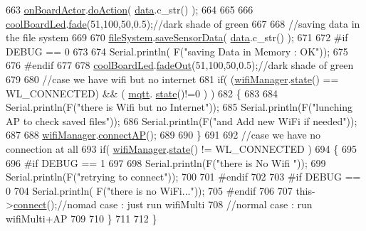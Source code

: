 \begin{DoxyCode}
663     \hyperlink{class_cool_board_a4ac693895c21025b8808653f2a4316e6}{onBoardActor}.\hyperlink{class_cool_board_actor_a96a45658d32c6b95caa2f385c7da32cd}{doAction}( \hyperlink{class_cool_board_a427fb753dd8575bdf821c70a5c63d695}{data}.c\_str() );  
664 
665 
666     \hyperlink{class_cool_board_a1b1d3c684a5baa56b08486e192fd8e97}{coolBoardLed}.\hyperlink{class_cool_board_led_af1cacbaa88db8bcf6042c1083ba41155}{fade}(51,100,50,0.5);\textcolor{comment}{//dark shade of green  }
667     
668     \textcolor{comment}{//saving data in the file system}
669     
670     \hyperlink{class_cool_board_a42c2586fbb13ff7f06538e9284e8538d}{fileSystem}.\hyperlink{class_cool_file_system_afa3a4feae94871d4d3b6bebb701c2e67}{saveSensorData}( \hyperlink{class_cool_board_a427fb753dd8575bdf821c70a5c63d695}{data}.c\_str() );
671 
672 \textcolor{preprocessor}{    #if DEBUG == 0}
673 
674         Serial.println( F(\textcolor{stringliteral}{"saving Data in Memory : OK"}));
675 
676 \textcolor{preprocessor}{    #endif}
677 
678     \hyperlink{class_cool_board_a1b1d3c684a5baa56b08486e192fd8e97}{coolBoardLed}.\hyperlink{class_cool_board_led_a93d545679237e8cc858324367149775c}{fadeOut}(51,100,50,0.5);\textcolor{comment}{//dark shade of green}
679 
680     \textcolor{comment}{//case we have wifi but no internet}
681     \textcolor{keywordflow}{if}( (\hyperlink{class_cool_board_acd88e6003606b47479ebba81e4aceeca}{wifiManager}.\hyperlink{class_cool_wifi_a1c7b4d82a4098d346e7593dce92039fa}{state}() == WL\_CONNECTED) && ( \hyperlink{class_cool_board_a2399f44d7c23c1149a335cb3b46d90f1}{mqtt}.
      \hyperlink{class_cool_m_q_t_t_a5d003307eff78efbd585e42b43b72b6d}{state}()!=0 ) )
682     \{
683         
684         Serial.println(F(\textcolor{stringliteral}{"there is Wifi but no Internet"}));
685         Serial.println(F(\textcolor{stringliteral}{"lunching AP to check saved files"}));
686         Serial.println(F(\textcolor{stringliteral}{"and Add new WiFi if needed"}));
687         
688         \hyperlink{class_cool_board_acd88e6003606b47479ebba81e4aceeca}{wifiManager}.\hyperlink{class_cool_wifi_a7c857f27161782f5ef1d62d552aff971}{connectAP}();
689         
690     \}
691     
692     \textcolor{comment}{//case we have no connection at all}
693     \textcolor{keywordflow}{if}( \hyperlink{class_cool_board_acd88e6003606b47479ebba81e4aceeca}{wifiManager}.\hyperlink{class_cool_wifi_a1c7b4d82a4098d346e7593dce92039fa}{state}() != WL\_CONNECTED )
694     \{
695     
696 \textcolor{preprocessor}{    #if DEBUG == 1}
697         
698         Serial.println(F(\textcolor{stringliteral}{"there is No Wifi "}));
699         Serial.println(F(\textcolor{stringliteral}{"retrying to connect"}));
700     
701 \textcolor{preprocessor}{    #endif}
702 
703 \textcolor{preprocessor}{    #if DEBUG == 0}
704         Serial.println( F(\textcolor{stringliteral}{"there is no WiFi..."}));
705 \textcolor{preprocessor}{    #endif}
706         
707         this->\hyperlink{class_cool_board_a519de78b807f8ec6463ff484eb925918}{connect}();\textcolor{comment}{//nomad case : just run wifiMulti}
708                 \textcolor{comment}{//normal case : run wifiMulti+AP}
709         
710     \}   
711 
712 \}
\end{DoxyCode}
